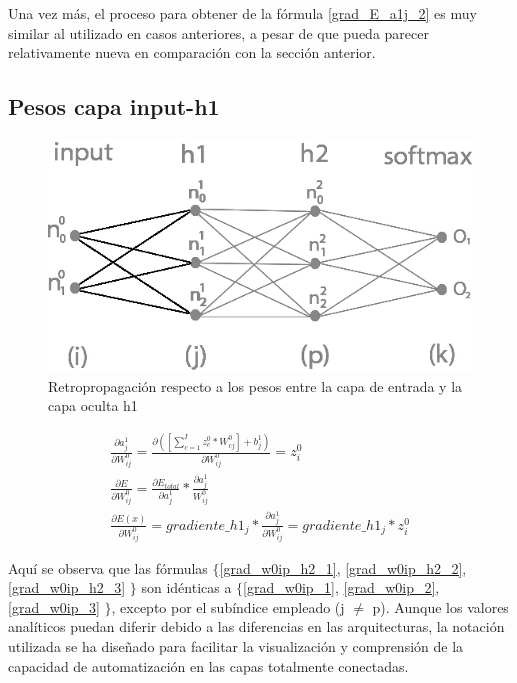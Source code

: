 Una vez más, el proceso para obtener de la fórmula \ref{grad_E_a1j_2} es muy similar al utilizado en casos anteriores, a pesar de que pueda parecer relativamente nueva en comparación con la sección anterior. \\


\subsection{Pesos capa input-h1}

\begin{figure}[H]
	\centering
	\includegraphics[scale=0.35]{imagenes/nn_2_capa_pesos_input_h1.jpg}  
	\caption{Retropropagación respecto a los pesos entre la capa de entrada y la capa oculta h1}
	\label{fig:nn_2_pesos_input_h1}
\end{figure}


\begin{gather}
	\frac{\partial a^1_j }{\partial W^0_{ij} } = \frac{\partial ([\sum_{c=1}^{I} z^0_c * W^0_{cj}] + b^1_j)}{\partial W^0_{ij} } = z^0_i \label{grad_w0ip_h2_1} \\
	\frac{\partial E}{\partial W^0_{ij}} = \frac{\partial E_{total} }{\partial a^1_j } * \frac{\partial a^1_j}{W^0_{ij}} \label{grad_w0ip_h2_2} \\
	\frac{\partial E(x) }{\partial W^0_{ij} } = gradiente\_h1_j * \frac{\partial a^1_j }{\partial W^0_{ij} } = gradiente\_h1_j * z^0_i \label{grad_w0ip_h2_3}
\end{gather}

Aquí se observa que las fórmulas $\{$\ref{grad_w0ip_h2_1}, \ref{grad_w0ip_h2_2}, \ref{grad_w0ip_h2_3} $\}$ son idénticas a $\{$\ref{grad_w0ip_1}, \ref{grad_w0ip_2}, \ref{grad_w0ip_3} $\}$, excepto por el subíndice empleado (j $\neq$ p). Aunque los valores analíticos puedan diferir debido a las diferencias en las arquitecturas, la notación utilizada se ha diseñado para facilitar la visualización y comprensión de la capacidad de automatización en las capas totalmente conectadas.

